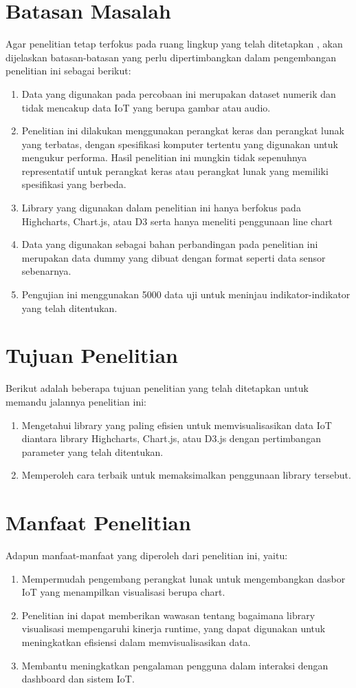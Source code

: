 \section{Batasan Masalah}
Agar penelitian tetap terfokus pada ruang lingkup yang telah ditetapkan \cite{muhammadred}, akan dijelaskan batasan-batasan yang perlu dipertimbangkan dalam pengembangan penelitian ini sebagai berikut:
\begin{enumerate}
    \item Data yang digunakan pada percobaan ini merupakan dataset numerik dan tidak mencakup data IoT yang berupa gambar atau audio. 
    \item Penelitian ini dilakukan menggunakan perangkat keras dan perangkat lunak yang terbatas, dengan spesifikasi komputer tertentu yang digunakan untuk mengukur performa. Hasil penelitian ini mungkin tidak sepenuhnya representatif untuk perangkat keras atau perangkat lunak yang memiliki spesifikasi yang berbeda.
    \item Library yang digunakan dalam penelitian ini hanya berfokus pada Highcharts, Chart.js, atau D3 serta hanya meneliti penggunaan line chart
    \item Data yang digunakan sebagai bahan perbandingan pada penelitian ini merupakan data dummy yang dibuat dengan format seperti data sensor sebenarnya.
    \item Pengujian ini menggunakan 5000 data uji untuk meninjau indikator-indikator yang telah ditentukan. 
\end{enumerate}

\section{Tujuan Penelitian}
Berikut adalah beberapa tujuan penelitian yang telah ditetapkan untuk memandu jalannya penelitian ini: 
\begin{enumerate}
    \item Mengetahui library yang paling efisien untuk memvisualisasikan data IoT diantara library Highcharts, Chart.js, atau D3.js dengan pertimbangan parameter yang telah ditentukan.
    \item Memperoleh cara terbaik untuk memaksimalkan penggunaan library tersebut.
\end{enumerate}

\section{Manfaat Penelitian}
Adapun manfaat-manfaat yang diperoleh dari penelitian ini, yaitu:
\begin{enumerate}
    \item Mempermudah pengembang perangkat lunak untuk mengembangkan dasbor IoT yang menampilkan visualisasi berupa chart. 
    \item Penelitian ini dapat memberikan wawasan tentang bagaimana library visualisasi mempengaruhi kinerja runtime, yang dapat digunakan untuk meningkatkan efisiensi dalam memvisualisasikan data.
    \item Membantu meningkatkan pengalaman pengguna dalam interaksi dengan dashboard dan sistem IoT.
\end{enumerate}

